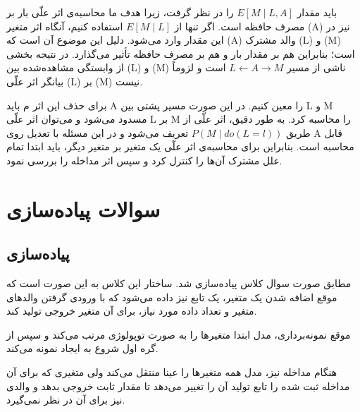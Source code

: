 باید مقدار
$
E[M \mid L, A]
$
را در نظر گرفت، زیرا هدف ما محاسبه‌ی اثر علّی بار  بر مصرف حافظه است. اگر تنها از
$
E[M \mid L]
$
استفاده کنیم، آنگاه اثر متغیر (A) نیز در این مقدار وارد می‌شود. دلیل این موضوع آن است که (A) والد مشترک (L) و (M) است؛ بنابراین هم بر مقدار بار  و هم بر مصرف حافظه تأثیر می‌گذارد. در نتیجه بخشی از وابستگی مشاهده‌شده بین (L) و (M) ناشی از مسیر
$
L \leftarrow A \rightarrow M
$
است و لزوماً بیانگر اثر علّی (L) بر (M) نیست.

برای حذف این اثر م باید A را معین کنیم. در این صورت مسیر پشتی بین L و M مسدود می‌شود و می‌توان اثر علّی L بر M را محاسبه کرد. به طور دقیق، اثر علّی از طریق
$
P(M \mid do(L=l))
$
تعریف می‌شود و در این مسئله با تعدیل روی A قابل محاسبه است. بنابراین برای محاسبه‌ی اثر علّی یک متغیر بر متغیر دیگر، باید ابتدا تمام علل مشترک آن‌ها را کنترل کرد و سپس اثر مداخله را بررسی نمود.

\section{سوالات پیاده‌سازی}
\subsection{پیاده‌سازی }
مطابق صورت سوال کلاس 
پیاده‌سازی شد. ساختار این کلاس به این صورت است که  موقع اضافه شدن یک متغیر، یک تابع نیز داده می‌شود که با ورودی گرفتن والدهای متغیر و تعداد داده مورد نیاز، برای آن متغیر خروجی تولید کند. 

موقع نمونه‌برداری، مدل ابتدا متغیرها را به صورت توپولوژی مرتب می‌کند و سپس از گره اول شروع به ایجاد نمونه می‌کند. 

هنگام مداخله نیز، مدل همه متغیرها را عینا منتقل می‌کند ولی متغیری که برای آن مداخله ثبت شده را تابع تولید آن را تغییر می‌دهد تا مقدار ثابت خروجی بدهد و والدی نیز برای آن در نظر نمی‌گیرد. 
